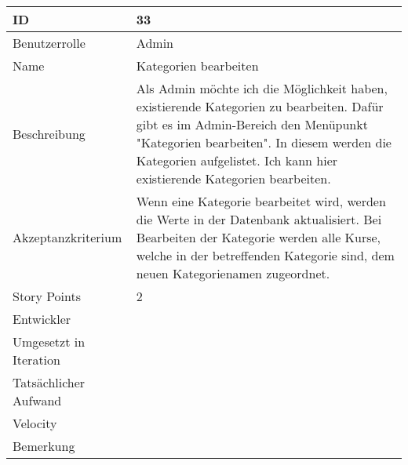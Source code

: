 \begin{tabularx}{\textwidth}{|p{}|X|}
	\hline
	ID & 33 \\
	\hline
	Benutzerrolle & Admin \\
	\hline
	Name & Kategorien bearbeiten\\
	\hline
	Beschreibung & Als Admin möchte ich die Möglichkeit haben, existierende Kategorien zu bearbeiten. Dafür gibt es im Admin-Bereich den Menüpunkt "Kategorien bearbeiten". In diesem werden die Kategorien aufgelistet. Ich kann hier existierende Kategorien bearbeiten. \\
	\hline
	Akzeptanzkriterium & Wenn eine Kategorie bearbeitet wird, werden die Werte in der Datenbank aktualisiert. Bei Bearbeiten der Kategorie werden alle Kurse, welche in der betreffenden Kategorie sind, dem neuen Kategorienamen zugeordnet. \\
	\hline
	Story Points & 2 \\
	\hline
	Entwickler &  \\
	\hline
	Umgesetzt in Iteration & \\
	\hline
	Tatsächlicher Aufwand & \\
	\hline
	Velocity & \\
	\hline
	Bemerkung & \\
	\hline
\end{tabularx}
\vspace{20pt}
